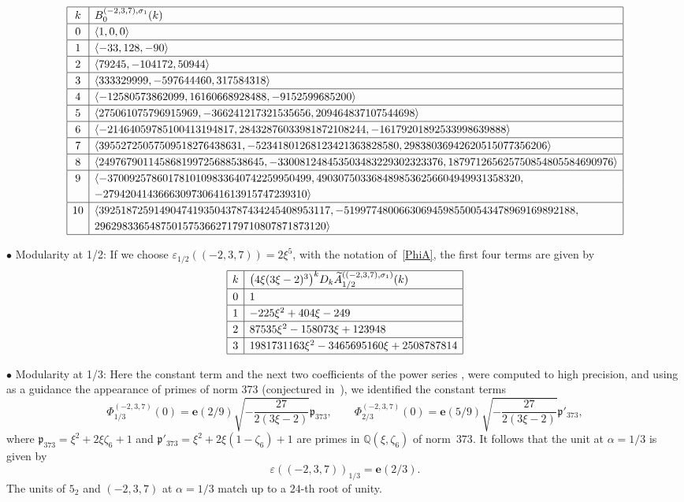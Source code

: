 \documentclass[pdftex]{sigma}
\numberwithin{equation}{section}
\def\BQ{\mathbb Q}
\def\la{\langle}
\def\ra{\rangle}
\def\wt{\widetilde}
\def\z{\zeta}
\def\e{\mathbf{e}}
\def\a{\alpha}
\def\p{\mathfrak p}
\def\e{\mathbf{e}}
\def\a{\alpha}
\def\z{\zeta}
\def\s{\sigma}
\def\ve{\varepsilon}
\def\tiA{\wt A}
\begin{document}
{\tiny
$$
\begin{array}{|c|l|} \hline
k & B^{(-2,3,7),\s_1}_{0}(k) \\ \hline
0 & \la 1, 0, 0\ra
\\ \hline
1 & \la -33, 128, -90\ra
\\ \hline
2 & \la 79245, -104172, 50944\ra
\\ \hline
3 & \la 333329999, -597644460, 317584318\ra
\\ \hline
4 & \la -12580573862099, 16160668928488, -9152599685200\ra
\\ \hline
5 & \la 275061075796915969, -366241217321535656, 209464837107544698\ra
\\ \hline
6 & \la -21464059785100413194817, 28432876033981872108244, -16179201892533998639888\ra
\\ \hline
7 & \la 39552725057509518276438631, -52341801268123421363828580, 29838036942620515077356206\ra
\\ \hline
8 & \la 249767901145868199725688538645, -330081248453503483229302323376, 187971265625750854805584690976\ra
\\ \hline
9 & \la -3700925786017810109833640742259950499, 4903075033684898536256604949931358320,
\\ &
-2794204143666309730641613915747239310\ra
\\ \hline
10 & \la 392518725914904741935043787434245408953117, -519977480066306945985500543478969169892188,
\\ &
296298336548750157536627179710807871873120\ra
\\ \hline
\end{array}
$$
}

$\bullet$ Modularity at 1/2:
If we choose $\ve_{1/2}((-2,3,7))=2 \xi^5 $, with the notation
of~\eqref{PhiA}, the first four terms are given by
$$
\def\arraystretch{1.2}
\begin{array}{|c|l|} \hline
k & \big(4  \xi (3\xi-2)^3\big)^k  D_k  \tiA^{((-2,3,7),\s_1)}_{1/2}(k) \\ \hline
0 & 1
\\ \hline
1 & -225 \xi^2 + 404 \xi - 249
\\ \hline
2 & 87535 \xi^2 - 158073 \xi + 123948
\\ \hline
3 & 1981731163 \xi^2 - 3465695160 \xi + 2508787814
\\ \hline
\end{array}
$$

$\bullet$ Modularity at 1/3: Here the constant term and the next two
coefficients of the power series ,
 were computed to high precision, and using as a guidance
the appearance of primes of norm 373 (conjectured in~\cite[Section~6.2]{DG}),
we identified the constant terms
\[
\Phi^{(-2,3,7)}_{1/3}(0) = \e(2/9) \sqrt{-\frac{27}{2 (3\xi-2)}} \p_{373},
\qquad
\Phi^{(-2,3,7)}_{2/3}(0) = \e(5/9) \sqrt{-\frac{27}{2 (3\xi-2)}} \p'_{373},
\]
where $\p_{373}=\xi^2+2 \xi \z_6 +1$ and $\p'_{373}=\xi^2+2 \xi (1-\z_6) +1$
are primes in $\BQ(\xi,\z_6)$ of norm~$373$.
It follows that the unit at $\a=1/3$ is given by
\[%
\ve((-2,3,7))_{1/3} = \e(2/3) .
\]
The units of $5_2$ and $(-2,3,7)$ at $\a=1/3$ match up to a $24$-th root of
unity.
\end{document}
